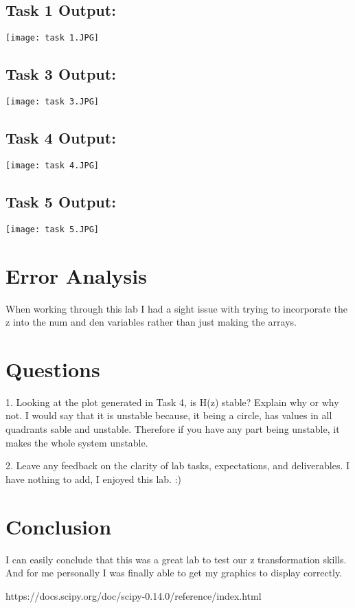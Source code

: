 \documentclass[12pt]{report}
\begin{document}
\subsection{Task 1 Output:}
\texttt{[image: task 1.JPG]}
\subsection{Task 3 Output:}
\texttt{[image: task 3.JPG]}

\subsection{Task 4 Output:}
\texttt{[image: task 4.JPG]}

\subsection{Task 5 Output:}
\texttt{[image: task 5.JPG]}

\section{Error Analysis}

When working through this lab I had a sight issue with trying to incorporate the z into the num and den variables rather than just making the arrays.

\section{Questions}

1. Looking at the plot generated in Task 4, is H(z) stable? Explain why or why not.
I would say that it is unstable because, it being a circle, has values in all quadrants sable and unstable. Therefore if you have any part being unstable, it makes the whole system unstable. 

2. Leave any feedback on the clarity of lab tasks, expectations, and deliverables.
    I have nothing to add, I enjoyed this lab. :)

\section{Conclusion}
I can easily conclude that this was a great lab to test our z transformation skills. And for me personally I was finally able to get my graphics to display correctly. 


\newpage


\begin{thebibliography}{111}

https://docs.scipy.org/doc/scipy-0.14.0/reference/index.html




\end{thebibliography}
\end{document}

